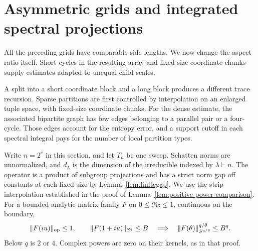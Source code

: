 \section{Asymmetric grids and integrated spectral projections}\label{tra:asymmetric}

All the preceding grids have comparable side lengths. We now change the aspect ratio itself. Short cycles in the resulting array and fixed-size coordinate chunks supply estimates adapted to unequal child scales.

A split into a short coordinate block and a long block produces a different trace recursion. Sparse partitions are first controlled by interpolation on an enlarged tuple space, with fixed-size coordinate chunks. For the dense estimate, the associated bipartite graph has few edges belonging to a parallel pair or a four-cycle. Those edges account for the entropy error, and a support cutoff in each spectral integral pays for the number of local partition types.

Write $n=2^e$ in this section, and let $T_n$ be one sweep. Schatten norms are unnormalized, and $d_\lambda$ is the dimension of the irreducible indexed by $\lambda\vdash n$. The operator is a product of subgroup projections and has a strict norm gap off constants at each fixed size by Lemma~\ref{lem:finitegap}.
\label{tra:asymmetric:strip-interpolation}
We use the strip interpolation established in the proof of
Lemma~\ref{lem:positive-power-comparison}. For a bounded analytic
matrix family $F$ on $0\le\Re z\le1$, continuous on the boundary,
\[
 \|F(iu)\|_{\rm op}\le1,\qquad \|F(1+iu)\|_{S^q}\le B
 \quad\Longrightarrow\quad
 \|F(\theta)\|_{S^{q/\theta}}^{q/\theta}\le B^q.
\]
Below $q$ is $2$ or $4$. Complex powers are zero on their kernels,
as in that proof.

